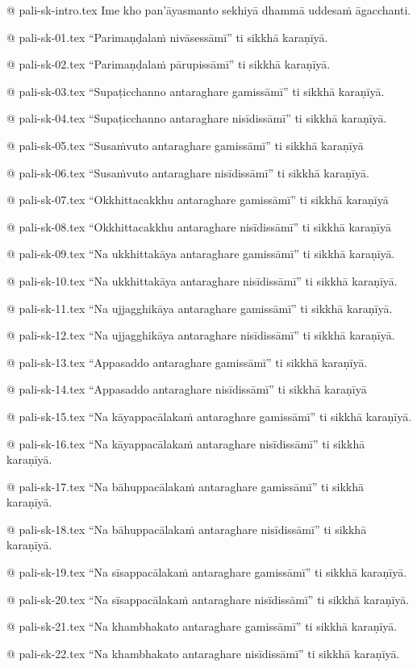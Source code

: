 @ pali-sk-intro.tex
Ime kho pan’āyasmanto sekhiyā dhammā uddesaṁ āgacchanti.

@ pali-sk-01.tex
“Parimaṇḍalaṁ nivāsessāmī” ti sikkhā karaṇīyā.

@ pali-sk-02.tex
“Parimaṇḍalaṁ pārupissāmī” ti sikkhā karaṇīyā.

@ pali-sk-03.tex
“Supaṭicchanno antaraghare gamissāmī” ti sikkhā karaṇīyā.

@ pali-sk-04.tex
“Supaṭicchanno antaraghare nisīdissāmī” ti sikkhā karaṇīyā.

@ pali-sk-05.tex
“Susaṁvuto antaraghare gamissāmī” ti sikkhā karaṇīyā

@ pali-sk-06.tex
“Susaṁvuto antaraghare nisīdissāmī” ti sikkhā karaṇīyā.

@ pali-sk-07.tex
“Okkhittacakkhu antaraghare gamissāmī” ti sikkhā karaṇīyā

@ pali-sk-08.tex
“Okkhittacakkhu antaraghare nisīdissāmī” ti sikkhā karaṇīyā

@ pali-sk-09.tex
“Na ukkhittakāya antaraghare gamissāmī” ti sikkhā karaṇīyā.

@ pali-sk-10.tex
“Na ukkhittakāya antaraghare nisīdissāmī” ti sikkhā karaṇīyā.

@ pali-sk-11.tex
“Na ujjagghikāya antaraghare gamissāmī” ti sikkhā karaṇīyā.

@ pali-sk-12.tex
“Na ujjagghikāya antaraghare nisīdissāmī” ti sikkhā karaṇīyā.

@ pali-sk-13.tex
“Appasaddo antaraghare gamissāmī” ti sikkhā karaṇīyā.

@ pali-sk-14.tex
“Appasaddo antaraghare nisīdissāmī” ti sikkhā karaṇīyā

@ pali-sk-15.tex
“Na kāyappacālakaṁ antaraghare gamissāmī” ti sikkhā karaṇīyā.

@ pali-sk-16.tex
“Na kāyappacālakaṁ antaraghare nisīdissāmī” ti sikkhā karaṇīyā.

@ pali-sk-17.tex
“Na bāhuppacālakaṁ antaraghare gamissāmī” ti sikkhā karaṇīyā.

@ pali-sk-18.tex
“Na bāhuppacālakaṁ antaraghare nisīdissāmī” ti sikkhā karaṇīyā.

@ pali-sk-19.tex
“Na sīsappacālakaṁ antaraghare gamissāmī” ti sikkhā karaṇīyā.

@ pali-sk-20.tex
“Na sīsappacālakaṁ antaraghare nisīdissāmī” ti sikkhā karaṇīyā.

@ pali-sk-21.tex
“Na khambhakato antaraghare gamissāmī” ti sikkhā karaṇīyā.

@ pali-sk-22.tex
“Na khambhakato antaraghare nisīdissāmī” ti sikkhā karaṇīyā.

